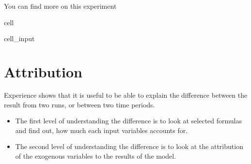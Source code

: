 \documentclass[letterpaper,10pt,english]{jupyterBook}
\begin{document}
\sphinxAtStartPar
You can find more on this experiment {\hyperref[\detokenize{content/howto/experiments/create_experiment::doc}]{}}

\begin{sphinxuseclass}{cell}\begin{sphinxVerbatimInput}

\begin{sphinxuseclass}{cell_input}
\begin{sphinxVerbatim}[commandchars=\\\{\}]
  
    
   
\end{sphinxVerbatim}

\end{sphinxuseclass}\end{sphinxVerbatimInput}

\end{sphinxuseclass}

\section{Attribution}
\label{\detokenize{content/howto/attribution/Attribution background:id1}}\label{\detokenize{content/howto/attribution/Attribution background:id2}}
\sphinxAtStartPar
Experience shows that it is useful to be able to explain the difference between the result from two runs, or between two time periods.
\begin{itemize}
\item {} 
\sphinxAtStartPar
The first level of understanding the difference is to look at selected formulas and find out, how much each input variables accounts for.

\item {} 
\sphinxAtStartPar
The second level of understanding the difference is to look at the attribution of the
exogenous variables to the results of the model.

\end{itemize}
\end{document}

